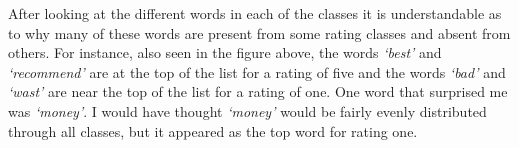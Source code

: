 \documentclass[a4paper, 11pt]{article}
\begin{document}
\noindent
After looking at the different words in each of the classes it is understandable as to why many of these words are present from some rating classes and absent from others. For instance, also seen in the figure above, the words \emph{‘best’} and \emph{‘recommend’} are at the top of the list for a rating of five and the words \emph{‘bad’} and \emph{‘wast’} are near the top of the list for a rating of one. One word that surprised me was \emph{‘money’}. I would have thought \emph{‘money’} would be fairly evenly distributed through all classes, but it appeared as the top word for rating one.
\end{document}
